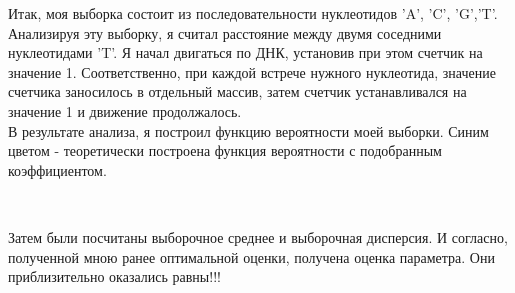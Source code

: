 \documentclass[a4paper,12pt, oneside]{book}
\begin{document}
Итак, моя выборка состоит из последовательности нуклеотидов 'A', 'C', 'G','T'. Анализируя эту выборку, я считал расстояние между двумя соседними нуклеотидами 'T'. Я начал двигаться по ДНК, установив при этом счетчик на значение 1. Соответственно, при каждой встрече нужного нуклеотида, значение счетчика заносилось в отдельный массив, затем счетчик устанавливался на значение 1 и движение продолжалось. \\

В результате анализа, я построил функцию вероятности моей выборки. Синим цветом - теоретически построена функция вероятности с подобранным коэффициентом.\\

\begin{figure}[h!]
	\begin{center}
		\begin{minipage}[h]{0.47\linewidth}
			  \\
			\vspace{15mm}
		\end{minipage}
	\end{center}
\end{figure}

Затем были посчитаны выборочное среднее и выборочная дисперсия. И согласно, полученной мною ранее оптимальной оценки, получена оценка параметра. Они приблизительно оказались равны!!!
\end{document}
